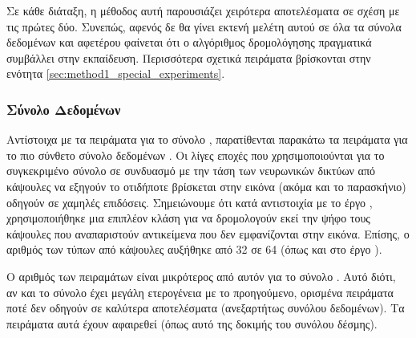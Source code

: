 Σε κάθε διάταξη, η μέθοδος αυτή παρουσιάζει χειρότερα αποτελέσματα σε σχέση με τις πρώτες δύο. Συνεπώς, αφενός δε θα γίνει εκτενή μελέτη αυτού σε όλα τα σύνολα δεδομένων και αφετέρου φαίνεται ότι ο αλγόριθμος δρομολόγησης πραγματικά συμβάλλει στην εκπαίδευση. Περισσότερα σχετικά πειράματα βρίσκονται στην ενότητα \ref{sec:method1_special_experiments}.

\subsubsection{Σύνολο Δεδομένων }
Αντίστοιχα με τα πειράματα για το σύνολο , παρατίθενται παρακάτω τα πειράματα για το πιο σύνθετο σύνολο δεδομένων . Οι λίγες εποχές που χρησιμοποιούνται για το συγκεκριμένο σύνολο σε συνδυασμό με την τάση των νευρωνικών δικτύων από κάψουλες να εξηγούν το οτιδήποτε βρίσκεται στην εικόνα (ακόμα και το παρασκήνιο) οδηγούν σε χαμηλές επιδόσεις. Σημειώνουμε ότι κατά αντιστοιχία με το έργο \cite{sabour2017dynamic}, χρησιμοποιήθηκε μια επιπλέον κλάση  για να δρομολογούν εκεί την ψήφο τους κάψουλες που αναπαριστούν αντικείμενα που δεν εμφανίζονται στην εικόνα. Επίσης, ο αριθμός των τύπων από κάψουλες αυξήθηκε από 32 σε 64 (όπως και στο έργο \cite{sabour2017dynamic}).\par

Ο αριθμός των πειραμάτων είναι μικρότερος από αυτόν για το σύνολο . Αυτό διότι, αν και το σύνολο  έχει μεγάλη ετερογένεια με το προηγούμενο, ορισμένα πειράματα ποτέ δεν οδηγούν σε καλύτερα αποτελέσματα (ανεξαρτήτως συνόλου δεδομένων). Τα πειράματα αυτά έχουν αφαιρεθεί (όπως αυτό της δοκιμής του συνόλου δέσμης).

